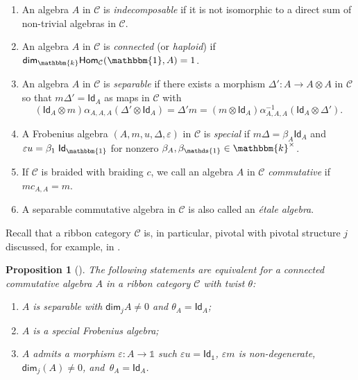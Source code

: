 \documentclass[pdftex]{sigma}
\numberwithin{equation}{section}
\newtheorem{Proposition}[Theorem]{Proposition}
 { \theoremstyle{definition}
\newtheorem{Definition}[Theorem]{Definition}
\newtheorem{Note}[Theorem]{Note}
\newtheorem{Notation}[Theorem]{Notation}
\newtheorem{Example}[Theorem]{Example}
\newtheorem{Remark}[Theorem]{Remark} }
\newcommand{\Hom}{\mathsf{Hom}}
\newcommand{\ide}{\mathsf{Id}}
\newcommand{\one}{\mathds{1}}
\renewcommand{\dim}{\mathsf{dim}}
\newcommand{\cC}{\mathcal{C}}
\begin{document}
\begin{Definition}\quad
\begin{enumerate}\itemsep=0pt
 \item[(a)] An algebra $A$ in $\cC$ is \textit{indecomposable} if it is not isomorphic to a direct sum of non-trivial algebras in $\cC$.
 \item[(b)] An algebra $A$ in $\cC$ is \textit{connected} (or \textit{haploid}) if
 $\dim_{\mathbbm{k}}\Hom_{\mathcal C} ( \mathbbm{1}, A ) = 1$.
 \item[(c)] An algebra $A$ in $\cC$ is \textit{separable} if there exists a morphism $\Delta' \colon A \to A \otimes A$ in $\cC$ so that $m \Delta' = \ide_A$ as maps in $\cC$ with
 \begin{equation*}
( \ide_A\otimes m ) \alpha_{A, A, A} ( \Delta'\otimes \ide_A ) = \Delta' m = ( m \otimes \ide_A ) \alpha^{-1}_{A, A, A} ( \ide_A\otimes \Delta' ).
 \end{equation*}
 \item[(d)] A Frobenius algebra $ ( A,m,u,\Delta,\varepsilon )$ in $\cC$ is
 \textit{special} if $m \Delta = \beta_A\ide_A$ and $\varepsilon u = \beta_1 \; \ide_\mathbbm{1}$ for nonzero $\beta_A,\beta_\one \in \mathbbm{k}^\times$.
 \item[(e)] If $\cC$ is braided with braiding $c$, we call an algebra $A$ in $\cC$ \emph{commutative} if $m c_{A,A}=m$.
 \item[(f)] A separable commutative algebra in $\cC$ is also called an \emph{\'etale algebra}.
 \end{enumerate}
\end{Definition}

Recall that a ribbon category $\cC$ is, in particular, pivotal with pivotal structure $j$ discussed, for example, in \cite[Section~2.5]{LW3}.

\begin{Proposition}[{\cite[Proposition 3.12]{LW3}}] \label{prop:rigidFrobcharacterization}
The following statements are equivalent for a connected commutative algebra $A$ in a ribbon category $\cC$ with twist $\theta$:
\begin{enumerate}\itemsep=0pt
 \item[$(a)$] $A$ is separable with $\dim_j A \neq 0$ and $\theta_A=\ide_A$;
 \item[$(b)$] $A$ is a special Frobenius algebra;
 \item[$(c)$] $A$ admits a morphism $\varepsilon\colon A\to \one$ such $\varepsilon u=\ide_\one$, $\varepsilon m$ is non-degenerate, $\dim_j(A)\neq 0$, and~${\theta_A=\ide_A}$.
\end{enumerate}
\end{Proposition}
\end{document}
